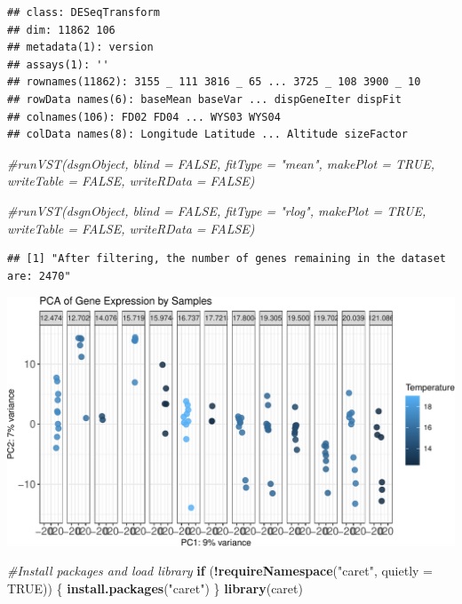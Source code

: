 \documentclass[
]{article}
\newenvironment{Shaded}{\begin{snugshade}}{\end{snugshade}}
\newcommand{\AttributeTok}[1]{\textcolor[rgb]{0.13,0.29,0.53}{#1}}
\newcommand{\CommentTok}[1]{\textcolor[rgb]{0.56,0.35,0.01}{\textit{#1}}}
\newcommand{\ConstantTok}[1]{\textcolor[rgb]{0.56,0.35,0.01}{#1}}
\newcommand{\ControlFlowTok}[1]{\textcolor[rgb]{0.13,0.29,0.53}{\textbf{#1}}}
\newcommand{\FunctionTok}[1]{\textcolor[rgb]{0.13,0.29,0.53}{\textbf{#1}}}
\newcommand{\NormalTok}[1]{#1}
\newcommand{\SpecialCharTok}[1]{\textcolor[rgb]{0.81,0.36,0.00}{\textbf{#1}}}
\newcommand{\StringTok}[1]{\textcolor[rgb]{0.31,0.60,0.02}{#1}}
\begin{document}
\begin{verbatim}
## class: DESeqTransform 
## dim: 11862 106 
## metadata(1): version
## assays(1): ''
## rownames(11862): 3155 _ 111 3816 _ 65 ... 3725 _ 108 3900 _ 10
## rowData names(6): baseMean baseVar ... dispGeneIter dispFit
## colnames(106): FD02 FD04 ... WYS03 WYS04
## colData names(8): Longitude Latitude ... Altitude sizeFactor
\end{verbatim}

\begin{Shaded}
\begin{Highlighting}[]
\CommentTok{\#runVST(dsgnObject, blind = FALSE, fitType = "mean", makePlot = TRUE, writeTable = FALSE, writeRData = FALSE)}

\CommentTok{\#runVST(dsgnObject, blind = FALSE, fitType = "rlog", makePlot = TRUE, writeTable = FALSE, writeRData = FALSE)}
\end{Highlighting}
\end{Shaded}

\begin{verbatim}
## [1] "After filtering, the number of genes remaining in the dataset are: 2470"
\end{verbatim}

\includegraphics{DPFE_files/figure-latex/unnamed-chunk-17-1.pdf}

\begin{Shaded}
\begin{Highlighting}[]
\CommentTok{\#Install packages and load library}
\ControlFlowTok{if}\NormalTok{ (}\SpecialCharTok{!}\FunctionTok{requireNamespace}\NormalTok{(}\StringTok{"caret"}\NormalTok{, }\AttributeTok{quietly =} \ConstantTok{TRUE}\NormalTok{)) \{}
  \FunctionTok{install.packages}\NormalTok{(}\StringTok{"caret"}\NormalTok{)}
\NormalTok{\}}
\FunctionTok{library}\NormalTok{(caret)}
\end{Highlighting}
\end{Shaded}
\end{document}
